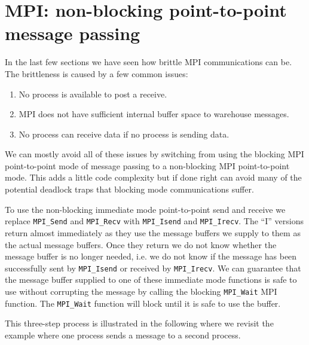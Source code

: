 \section{MPI: non-blocking point-to-point message passing}

In the last few sections we have seen how brittle MPI communications can be. The brittleness is caused by a few common issues:

\begin{enumerate}
    \item No process is available to post a receive.
    \item MPI does not have sufficient internal buffer space to warehouse messages.
    \item No process can receive data if no process is sending data.
\end{enumerate}

We can mostly avoid all of these issues by switching from using the blocking MPI point-to-point mode of message passing to a non-blocking MPI point-to-point mode. This adds a little code complexity but if done right can avoid many of the potential deadlock traps that blocking mode communications suffer.

To use the non-blocking immediate mode point-to-point send and receive we replace \texttt{MPI\_Send} and \texttt{MPI\_Recv} with \texttt{MPI\_Isend} and \texttt{MPI\_Irecv}. The ``I'' versions return almost immediately as they use the message buffers we supply to them as the actual message buffers. Once they return we do not know whether the message buffer is no longer needed, i.e. we do not know if the message has been successfully sent by \texttt{MPI\_Isend} or received by \texttt{MPI\_Irecv}. We can guarantee that the message buffer supplied to one of these immediate mode functions is safe to use without corrupting the message by calling the blocking \texttt{MPI\_Wait} MPI function. The \texttt{MPI\_Wait} function will block until it is safe to use the buffer.

This three-step process is illustrated in the following where we revisit the example where one process sends a message to a second process.

